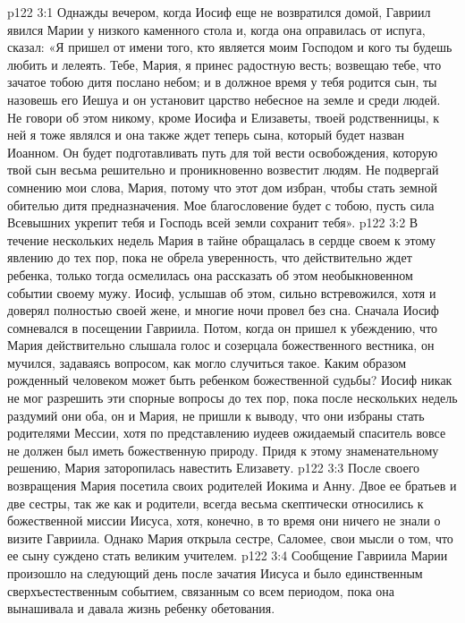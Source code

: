 \vs p122 3:1 Однажды вечером, когда Иосиф еще не возвратился домой, Гавриил явился Марии у низкого каменного стола и, когда она оправилась от испуга, сказал: «Я пришел от имени того, кто является моим Господом и кого ты будешь любить и лелеять. Тебе, Мария, я принес радостную весть; возвещаю тебе, что зачатое тобою дитя послано небом; и в должное время у тебя родится сын, ты назовешь его Иешуа и он установит царство небесное на земле и среди людей. Не говори об этом никому, кроме Иосифа и Елизаветы, твоей родственницы, к ней я тоже являлся и она также ждет теперь сына, который будет назван Иоанном. Он будет подготавливать путь для той вести освобождения, которую твой сын весьма решительно и проникновенно возвестит людям. Не подвергай сомнению мои слова, Мария, потому что этот дом избран, чтобы стать земной обителью дитя предназначения. Мое благословение будет с тобою, пусть сила Всевышних укрепит тебя и Господь всей земли сохранит тебя».
\vs p122 3:2 \pc В течение нескольких недель Мария в тайне обращалась в сердце своем к этому явлению до тех пор, пока не обрела уверенность, что действительно ждет ребенка, только тогда осмелилась она рассказать об этом необыкновенном событии своему мужу. Иосиф, услышав об этом, сильно встревожился, хотя и доверял полностью своей жене, и многие ночи провел без сна. Сначала Иосиф сомневался в посещении Гавриила. Потом, когда он пришел к убеждению, что Мария действительно слышала голос и созерцала божественного вестника, он мучился, задаваясь вопросом, как могло случиться такое. Каким образом рожденный человеком может быть ребенком божественной судьбы? Иосиф никак не мог разрешить эти спорные вопросы до тех пор, пока после нескольких недель раздумий они оба, он и Мария, не пришли к выводу, что они избраны стать родителями Мессии, хотя по представлению иудеев ожидаемый спаситель вовсе не должен был иметь божественную природу. Придя к этому знаменательному решению, Мария заторопилась навестить Елизавету.
\vs p122 3:3 После своего возвращения Мария посетила своих родителей Иокима и Анну. Двое ее братьев и две сестры, так же как и родители, всегда весьма скептически относились к божественной миссии Иисуса, хотя, конечно, в то время они ничего не знали о визите Гавриила. Однако Мария открыла сестре, Саломее, свои мысли о том, что ее сыну суждено стать великим учителем.
\vs p122 3:4 \pc Сообщение Гавриила Марии произошло на следующий день после зачатия Иисуса и было единственным сверхъестественным событием, связанным со всем периодом, пока она вынашивала и давала жизнь ребенку обетования.
